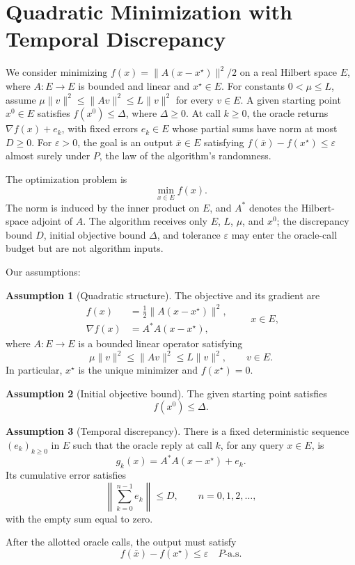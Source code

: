 \documentclass[10pt]{article}
\theoremstyle{definition}
\newtheorem{assumption}{Assumption}
\begin{document}
\section*{Quadratic Minimization with Temporal Discrepancy}
We consider minimizing $f(x)=\|A(x-x^\star)\|^2/2$ on a real Hilbert space $E$, where $A:E\to E$ is bounded and linear and $x^\star\in E$. For constants $0<\mu\leq L$, assume $\mu\|v\|^2\leq\|Av\|^2\leq L\|v\|^2$ for every $v\in E$. A given starting point $x^0\in E$ satisfies $f(x^0)\leq\Delta$, where $\Delta\geq0$. At call $k\geq0$, the oracle returns $\nabla f(x)+e_k$, with fixed errors $e_k\in E$ whose partial sums have norm at most $D\geq0$. For $\varepsilon>0$, the goal is an output $\bar{x}\in E$ satisfying $f(\bar{x})-f(x^\star)\leq\varepsilon$ almost surely under $P$, the law of the algorithm's randomness.

The optimization problem is
\[
\min_{x\in E} f(x).
\]
The norm is induced by the inner product on $E$, and $A^*$ denotes the Hilbert-space adjoint of $A$. The algorithm receives only $E$, $L$, $\mu$, and $x^0$; the discrepancy bound $D$, initial objective bound $\Delta$, and tolerance $\varepsilon$ may enter the oracle-call budget but are not algorithm inputs.

Our assumptions:
\begin{assumption}[Quadratic structure]
The objective and its gradient are
\[
\begin{aligned}
f(x)&=\frac12\|A(x-x^\star)\|^2,\\
\nabla f(x)&=A^*A(x-x^\star),
\end{aligned}
\qquad x\in E,
\]
where $A:E\to E$ is a bounded linear operator satisfying
\[
\mu\|v\|^2\leq\|Av\|^2\leq L\|v\|^2,
\qquad v\in E.
\]
In particular, $x^\star$ is the unique minimizer and $f(x^\star)=0$.
\end{assumption}

\begin{assumption}[Initial objective bound]
The given starting point satisfies
\[
f(x^0)\leq\Delta.
\]
\end{assumption}

\begin{assumption}[Temporal discrepancy]
There is a fixed deterministic sequence $(e_k)_{k\geq0}$ in $E$ such that the oracle reply at call $k$, for any query $x\in E$, is
\[
g_k(x)=A^*A(x-x^\star)+e_k.
\]
Its cumulative error satisfies
\[
\left\|\sum_{k=0}^{n-1}e_k\right\|\leq D,
\qquad n=0,1,2,\ldots,
\]
with the empty sum equal to zero.
\end{assumption}

After the allotted oracle calls, the output must satisfy
\[
f(\bar{x})-f(x^\star)\leq\varepsilon
\quad P\text{-a.s.}
\]
\end{document}
